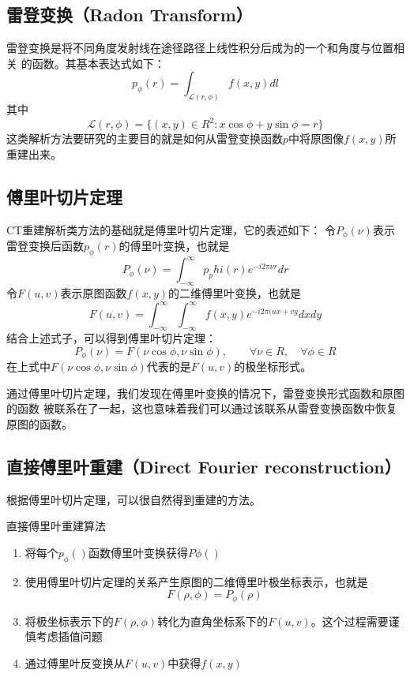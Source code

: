 \subsection{雷登变换（Radon Transform）}
雷登变换是将不同角度发射线在途径路径上线性积分后成为的一个和角度与位置相关
的函数。其基本表达式如下：
\begin{equation*}
p_\phi(r)=\int_{\mathcal{L}(r,\phi)}f(x,y)dl
\end{equation*}
其中
\begin{equation*}
\mathcal{L}(r,\phi)=\{(x,y)\in R^2:x\cos\phi+y\sin\phi=r\}
\end{equation*}
这类解析方法要研究的主要目的就是如何从雷登变换函数$p$中将原图像$f(x,y)$所重建出来。

\subsection{傅里叶切片定理}
CT重建解析类方法的基础就是傅里叶切片定理，它的表述如下：
令$P_\phi(\nu)$表示雷登变换后函数$p_\phi(r)$的傅里叶变换，也就是
\begin{equation*}
P_\phi(\nu)=\int^\infty_{-\infty}p_phi(r)e^{-i2\pi \nu r}dr
\end{equation*}
令$F(u,v)$表示原图函数$f(x,y)$的二维傅里叶变换，也就是
\begin{equation*}
F(u,v)=\int^\infty_{-\infty}\int^\infty_{-\infty}f(x,y)e^{-i2\pi(ux+vy}dxdy
\end{equation*}
结合上述式子，可以得到傅里叶切片定理：
\begin{equation*}
P_\phi(\nu)=F(\nu\cos\phi,\nu\sin\phi),\qquad \forall\nu\in R,\quad\forall\phi\in R
\end{equation*}
在上式中$F(\nu\cos\phi,\nu\sin\phi)$代表的是$F(u,v)$的极坐标形式。

通过傅里叶切片定理，我们发现在傅里叶变换的情况下，雷登变换形式函数和原图的函数
被联系在了一起，这也意味着我们可以通过该联系从雷登变换函数中恢复原图的函数。

\subsection{直接傅里叶重建（Direct Fourier reconstruction）}
根据傅里叶切片定理，可以很自然得到重建的方法\cite{de1968reconstruction}。
\begin{algo}
直接傅里叶重建算法
\begin{enumerate}
\item{将每个$p_\phi()$函数傅里叶变换获得$P\phi()$}
\item{使用傅里叶切片定理的关系产生原图的二维傅里叶极坐标表示，也就是
\begin{equation*}
F(\rho,\phi)=P_\phi(\rho)
\end{equation*}}
\item{将极坐标表示下的$F(\rho,\phi)$转化为直角坐标系下的$F(u,v)$。这个过程需要谨慎考虑插值问题}
\item{通过傅里叶反变换从$F(u,v)$中获得$f(x,y)$}
\end{enumerate}
\end{algo}

